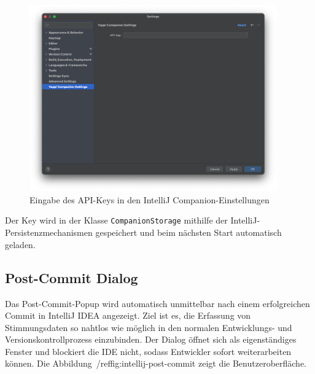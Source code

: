 \documentclass[12pt,a4paper]{report}
\begin{document}
\begin{figure}[H]
\centering
\includegraphics[width=0.95\textwidth]{../figures/intellij-settings.png}
\caption{Eingabe des API-Keys in den IntelliJ Companion-Einstellungen}
\label{fig:intellij-settings}
\end{figure}

Der Key wird in der Klasse \texttt{CompanionStorage} mithilfe der IntelliJ-Persistenzmechanismen gespeichert und beim nächsten
Start automatisch geladen.

\subsection{Post-Commit Dialog}

Das Post-Commit-Popup wird automatisch unmittelbar nach einem erfolgreichen Commit in IntelliJ IDEA angezeigt. Ziel ist es, die
Erfassung von Stimmungsdaten so nahtlos wie möglich in den normalen Entwicklungs- und Versionskontrollprozess einzubinden. Der
Dialog öffnet sich als eigenständiges Fenster und blockiert die IDE nicht, sodass Entwickler sofort weiterarbeiten können. Die
Abbildung~/ref{fig:intellij-post-commit} zeigt die Benutzeroberfläche.
\end{document}
